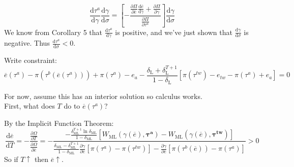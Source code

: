 \documentclass[12pt]{article}
\newcommand{\ov}{\overline}
\newcommand{\bta}{\bm{\tau^a}}
\newcommand{\btw}{\bm{\tau^{tw}}}
\newcommand{\ga}{\gamma}
\newcommand{\de}{\delta}
\begin{document}
\begin{equation}
 	\frac{\mathrm{d} \tau^a}{\mathrm{d} \ga} \frac{\mathrm{d} \ga}{\mathrm{d} \sigma} = \left[-\frac{\frac{\partial \Pi}{\partial \ov{e}}\frac{\mathrm{d} \ov{e}}{\mathrm{d} \ga}+\frac{\partial \Pi}{\partial \ga}}{\frac{\partial \Pi}{\partial \tau^a}} \right] \frac{\mathrm{d} \ga}{\mathrm{d} \sigma}
\end{equation}
We know from Corollary 5 that $\frac{\mathrm{d} \tau^a}{\mathrm{d} \ga}$ is positive, and we've just shown that $\frac{\mathrm{d} \ga}{\mathrm{d} \sigma}$ is negative. Thus $\frac{\mathrm{d} \tau^a}{\mathrm{d} \sigma} <0$.

\vskip1in
Write constraint:
\[
  \ov{e}(\tau^a) - \pi(\tau^b(\ov{e}(\tau^a))) + \pi(\tau^a) - e_a - \frac{\de_\text{L} + \de_\text{L}^{T+1}}{1-\de_\text{L}} \left[\pi(\tau^{tw}) - e_{tw} -\pi(\tau^a) + e_a \right] = 0
\]

For now, assume this has an interior solution so calculus works. \\

First, what does $T$ do to $\ov{e}(\tau^a)$?

By the Implicit Function Theorem:
\begin{equation}
 	\frac{\mathrm{d} \ov{e}}{\mathrm{d} T} = -\frac{\frac{\partial \Omega}{\partial T}}{\frac{\partial \Omega}{\partial \ov{e}}} = 
	- \textstyle \frac{- \frac{\de_\text{ML}^{T+1}\ln\de_\text{ML}}{1-\de_\text{ML}}\left[  W_\text{ML}(\ga(\ov{e}),\bta) - W_\text{ML}(\ga(\ov{e}),\btw) \right]} {\frac{\de_\text{ML} - \de_\text{ML}^{T+1}}{1-\de_\text{ML}}\frac{\partial \ga}{\partial \ov{e}}\left[ \pi(\tau^a) - \pi(\tau^{tw}) \right] - \frac{\partial \ga}{\partial \ov{e}}\left[ \pi(\tau^b(\ov{e})) - \pi(\tau^{a}) \right]} > 0
	\label{eq:coret}
\end{equation}
So if $T \uparrow$ then $\ov{e} \uparrow$.
\end{document}
